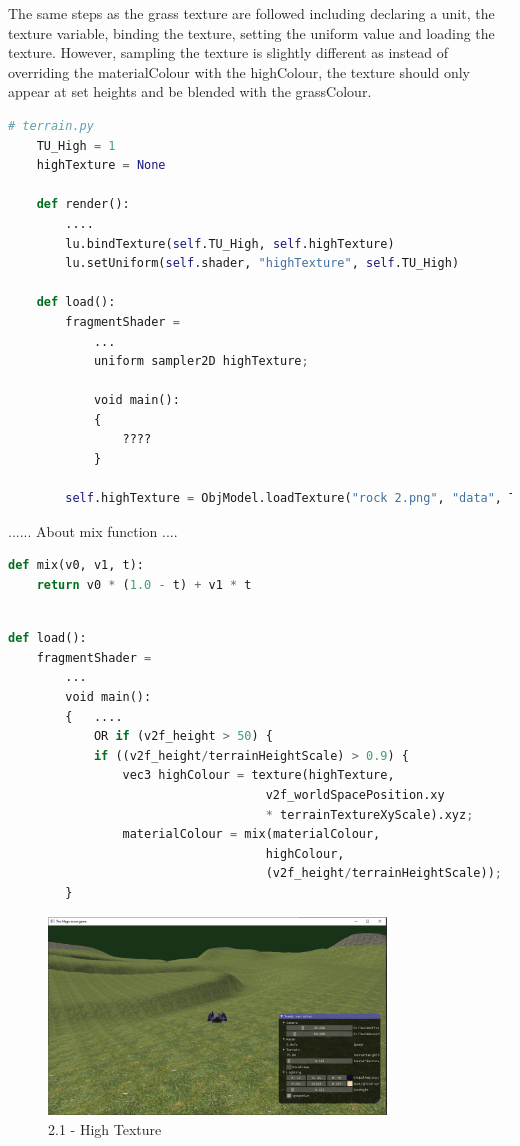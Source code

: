 \documentclass[a4 paper, 12pt]{article}
\begin{document}
The same steps as the grass texture are followed including declaring a unit, the texture variable, binding the texture, setting the uniform value and loading the texture. However, sampling the texture is slightly different as instead of overriding the materialColour with the highColour, the texture should only appear at set heights and be blended with the grassColour.

\begin{lstlisting}[language=python]
    # terrain.py
    TU_High = 1
    highTexture = None
    
    def render():
        ....
        lu.bindTexture(self.TU_High, self.highTexture)
        lu.setUniform(self.shader, "highTexture", self.TU_High)
    
    def load():
        fragmentShader = 
            ...
            uniform sampler2D highTexture;
    
            void main():
            {   
                ????
            }
        
        self.highTexture = ObjModel.loadTexture("rock 2.png", "data", True)        
        \end{lstlisting}




...... About mix function ....
\begin{lstlisting}[language=python]
def mix(v0, v1, t):
    return v0 * (1.0 - t) + v1 * t
\end{lstlisting}




    \begin{lstlisting}[language=python]

def load():
    fragmentShader = 
        ...   
        void main():
        {   ....
            OR if (v2f_height > 50) {
            if ((v2f_height/terrainHeightScale) > 0.9) {
                vec3 highColour = texture(highTexture, 
                                    v2f_worldSpacePosition.xy 
                                    * terrainTextureXyScale).xyz;
                materialColour = mix(materialColour, 
                                    highColour, 
                                    (v2f_height/terrainHeightScale));
        }       
    \end{lstlisting}


    \begin{figure} [H]
        \centering
        \includegraphics[width=0.8\textwidth, frame]
            {./images/2.1_a.PNG}
        \caption{2.1 - High Texture}   
    \end{figure}
\end{document}

